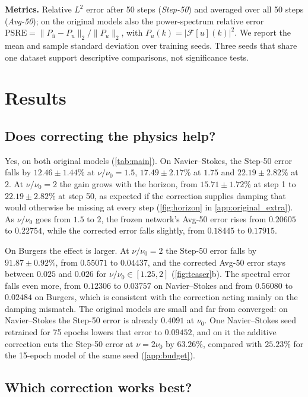 \documentclass{article}
\theoremstyle{plain}
\newcommand{\add}{additive correction\xspace}
\newcommand{\PSRE}{\mathrm{PSRE}}
\newcommand{\F}{\mathcal{F}}
\begin{document}
\textbf{Metrics.}
Relative $L^2$ error after 50 steps (\emph{Step-50}) and averaged over all 50 steps (\emph{Avg-50}); on the original models also the power-spectrum relative error $\PSRE=\|P_{\hat u}-P_u\|_2/\|P_u\|_2$, with $P_u(k)=|\F[u](k)|^2$.
We report the mean and sample standard deviation over training seeds.
Three seeds that share one dataset support descriptive comparisons, not significance tests.

\section{Results}
\label{sec:results}

\subsection{Does correcting the physics help?}
\label{sec:help}



Yes, on both original models (\cref{tab:main}).
On Navier--Stokes, the Step-50 error falls by $12.46\pm1.44\%$ at $\nu/\nu_0=1.5$, $17.49\pm2.17\%$ at $1.75$ and $22.19\pm2.82\%$ at $2$.
At $\nu/\nu_0=2$ the gain grows with the horizon, from $15.71\pm1.72\%$ at step 1 to $22.19\pm2.82\%$ at step 50, as expected if the correction supplies damping that would otherwise be missing at every step (\cref{fig:horizon} in \cref{app:original_extra}).
As $\nu/\nu_0$ goes from $1.5$ to $2$, the frozen network's Avg-50 error rises from $0.20605$ to $0.22754$, while the corrected error falls slightly, from $0.18445$ to $0.17915$.

On Burgers the effect is larger. At $\nu/\nu_0=2$ the Step-50 error falls by $91.87\pm0.92\%$, from $0.55071$ to $0.04437$, and the corrected Avg-50 error stays between $0.025$ and $0.026$ for $\nu/\nu_0\in[1.25,2]$ (\cref{fig:teaser}b).
The spectral error falls even more, from $0.12306$ to $0.03757$ on Navier--Stokes and from $0.56080$ to $0.02484$ on Burgers, which is consistent with the correction acting mainly on the damping mismatch.
The original models are small and far from converged: on Navier--Stokes the Step-50 error is already $0.4091$ at $\nu_0$.
One Navier--Stokes seed retrained for 75 epochs lowers that error to $0.09452$, and on it the \add cuts the Step-50 error at $\nu=2\nu_0$ by $63.26\%$, compared with $25.23\%$ for the 15-epoch model of the same seed (\cref{app:budget}).

\subsection{Which correction works best?}
\label{sec:which}
\end{document}
